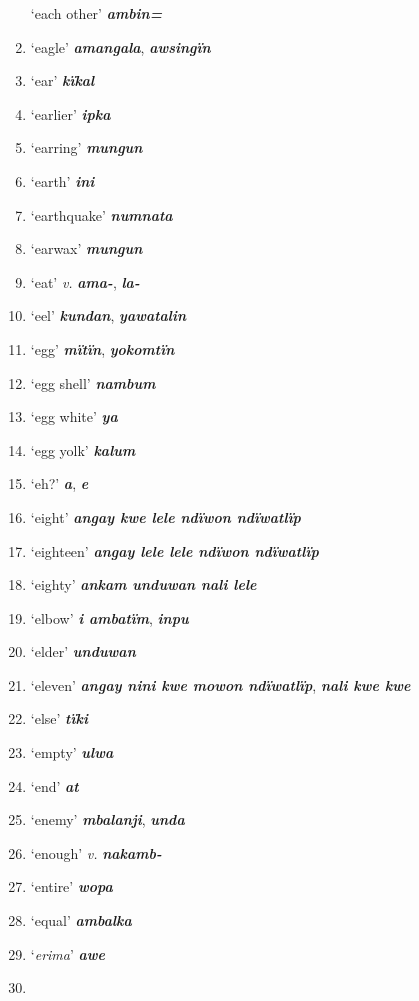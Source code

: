 \begin{enumerate}[noitemsep, label={}, align=left, widest=190, labelsep=1ex,leftmargin=*,itemindent=-10pt]
‘each other’ \textbf{\textit{ambin=}} \item
‘eagle’ \textbf{\textit{amangala}}, \textbf{\textit{awsingïn}} \item
‘ear’ \textbf{\textit{kïkal}} \item
‘earlier’ \textbf{\textit{ipka}} \item
‘earring’ \textbf{\textit{mungun}} \item
‘earth’ \textbf{\textit{ini}} \item
‘earthquake’ \textbf{\textit{numnata}} \item
‘earwax’ \textbf{\textit{mungun}} \item
‘eat’ \textit{v.} \textbf{\textit{ama-}}, \textbf{\textit{la-}} \item
‘eel’ \textbf{\textit{kundan}}, \textbf{\textit{yawatalin}} \item
‘egg’ \textbf{\textit{mïtïn}}, \textbf{\textit{yokomtïn}} \item
‘egg shell’ \textbf{\textit{nambum}} \item
‘egg white’ \textbf{\textit{ya}} \item
‘egg yolk’ \textbf{\textit{kalum}} \item
‘eh?’ \textbf{\textit{a}}, \textbf{\textit{e}} \item
‘eight’ \textbf{\textit{angay kwe lele ndïwon ndïwatlïp}} \item
‘eighteen’ \textbf{\textit{angay lele lele ndïwon ndïwatlïp}} \item
‘eighty’ \textbf{\textit{ankam unduwan nali lele}} \item
‘elbow’ \textbf{\textit{i ambatïm}}, \textbf{\textit{inpu}} \item
‘elder’ \textbf{\textit{unduwan}} \item
‘eleven’ \textbf{\textit{angay nini kwe mowon ndïwatlïp}}, \textbf{\textit{nali kwe kwe}} \item
‘else’ \textbf{\textit{tïki}} \item
‘empty’ \textbf{\textit{ulwa}} \item
‘end’ \textbf{\textit{at}} \item
‘enemy’ \textbf{\textit{mbalanji}}, \textbf{\textit{unda}} \item
‘enough’ \textit{v.} \textbf{\textit{nakamb-}} \item
‘entire’ \textbf{\textit{wopa}} \item
‘equal’ \textbf{\textit{ambalka}} \item
‘\textit{erima}’ \textbf{\textit{awe}} \item

\end{enumerate}
